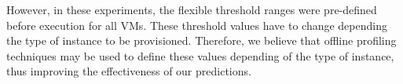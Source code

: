 However, in these experiments, the flexible threshold ranges were pre-defined before execution for all VMs. These threshold values have to change depending the type of instance to be provisioned. Therefore, we believe that offline profiling techniques may be used to define these values depending of the type of instance, thus improving the effectiveness of our predictions.




